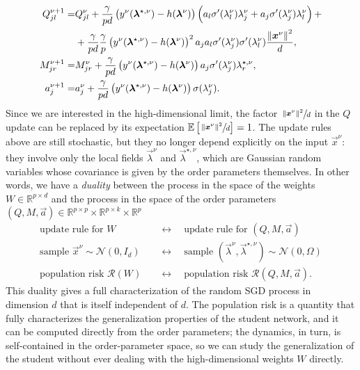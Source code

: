 \begin{equation} \label{eq:intro:op-update}
\begin{aligned}
    Q^{\nu+1}_{jl} =& Q^{\nu}_{jl} + \frac{\gamma}{pd} \left( y^\nu({\boldsymbol{\lambda}}^{\star,\nu}) - h({\boldsymbol{\lambda}}^{\nu}) \right) \left( a_l \sigma'(\lambda^\nu_l) \lambda^\nu_j + a_j \sigma'(\lambda^\nu_j) \lambda^\nu_l  \right) + \\ & + \frac{\gamma}{p d} \frac{\gamma}{p}\left( y^\nu({\boldsymbol{\lambda}}^{\star,\nu}) - h({\boldsymbol{\lambda}}^{\nu}) \right)^2 a_j a_l \sigma'(\lambda^\nu_j) \sigma'(\lambda^\nu_l) \frac{\left\lVert {\boldsymbol{x}}^\nu\right\rVert^2}{d}, \\
    M^{\nu+1}_{jr} =& M^{\nu}_{jr} + \frac{\gamma}{pd} \left( y^\nu({\boldsymbol{\lambda}}^{\star,\nu}) - h({\boldsymbol{\lambda}}^{\nu}) \right) a_j \sigma'(\lambda^\nu_j) \lambda^{\star,\nu}_r , \\
    a_j^{\nu+1} =& a_j^{\nu} + \frac{\gamma}{pd} \left( y^\nu({\boldsymbol{\lambda}}^{\star,\nu}) - h({\boldsymbol{\lambda}}^{\nu}) \right) \sigma(\lambda^\nu_j).
\end{aligned}
\end{equation}
Since we are interested in the high-dimensional limit, the factor $\sfrac{\left\lVert {\boldsymbol{x}}^\nu\right\rVert^2}{d}$ in the $Q$ update can be replaced by its expectation $\mathbb{E}\left[\sfrac{\left\lVert {\boldsymbol{x}}^\nu\right\rVert^2}{d}\right] = 1$. 
The update rules above are still stochastic, but they no longer depend explicitly on the input $\vec{x}^\nu$: they involve only the local fields $\vec{\lambda}^\nu$ and $\vec{\lambda}^{\star,\nu}$, which are Gaussian random variables whose covariance is given by the order parameters themselves. In other words, we have a \emph{duality} between the process in the space of the weights \(W\in\mathbb{R}^{p\times d}\) and the process in the space of the order parameters \((Q, M, \vec{a})\in\mathbb{R}^{p\times p}\times\mathbb{R}^{p\times k}\times\mathbb{R}^p\)
\begin{align*}
    \text{update rule for } W \quad &\leftrightarrow \quad \text{update rule for } (Q, M, \vec{a}) \\
    \text{sample } \vec{x}^\nu \sim \mathcal{N}(0, I_d) \quad &\leftrightarrow \quad \text{sample } (\vec{\lambda}^\nu, \vec{\lambda}^{\star,\nu}) \sim \mathcal{N}(0, \Omega) \\
    \text{population risk } \mathcal{R}(W) \quad &\leftrightarrow \quad \text{population risk } \mathcal{R}(Q, M, \vec{a}).
\end{align*}
This duality gives a full characterization of the random SGD process in dimension \(d\) that is itself independent of \(d\). The population risk is a quantity that fully characterizes the generalization properties of the student network, and it can be computed directly from the order parameters; the dynamics, in turn, is self-contained in the order-parameter space, so we can study the generalization of the student without ever dealing with the high-dimensional weights \(W\) directly.

